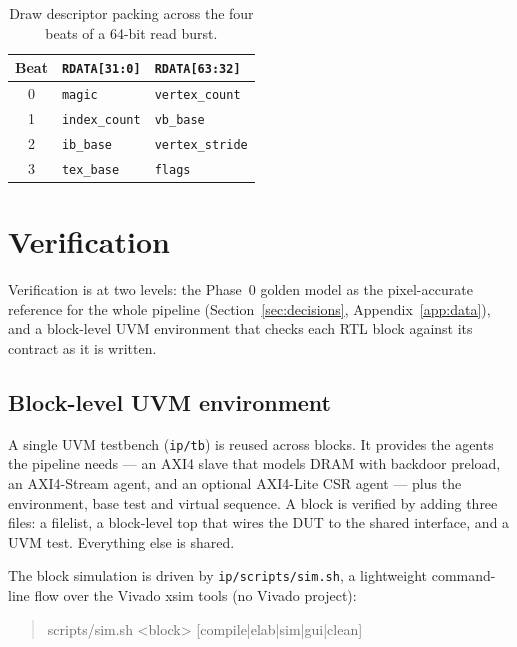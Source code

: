 \documentclass[11pt,a4paper]{article}
\begin{document}
\begin{table}[ht]
\centering
\begin{tabular}{@{}cll@{}}
\toprule
\textbf{Beat} & \textbf{\texttt{RDATA[31:0]}} & \textbf{\texttt{RDATA[63:32]}} \\
\midrule
0 & \texttt{magic}       & \texttt{vertex\_count} \\
1 & \texttt{index\_count}& \texttt{vb\_base} \\
2 & \texttt{ib\_base}    & \texttt{vertex\_stride} \\
3 & \texttt{tex\_base}   & \texttt{flags} \\
\bottomrule
\end{tabular}
\caption{Draw descriptor packing across the four beats of a 64-bit read burst.}
\label{tab:descriptor-beats}
\end{table}

\section{Verification}
\label{sec:verification}

Verification is at two levels: the Phase~0 golden model as the pixel-accurate
reference for the whole pipeline (Section~\ref{sec:decisions},
Appendix~\ref{app:data}), and a block-level UVM environment that checks each RTL
block against its contract as it is written.

\subsection{Block-level UVM environment}

A single UVM testbench (\texttt{ip/tb}) is reused across blocks. It provides the
agents the pipeline needs --- an AXI4 slave that models DRAM with backdoor
preload, an AXI4-Stream agent, and an optional AXI4-Lite CSR agent --- plus the
environment, base test and virtual sequence. A block is verified by adding three
files: a filelist, a block-level top that wires the DUT to the shared
interface, and a UVM test. Everything else is shared.

The block simulation is driven by \texttt{ip/scripts/sim.sh}, a lightweight
command-line flow over the Vivado xsim tools (no Vivado project):

\begin{quote}\ttfamily
scripts/sim.sh <block> [compile|elab|sim|gui|clean]
\end{quote}
\end{document}
